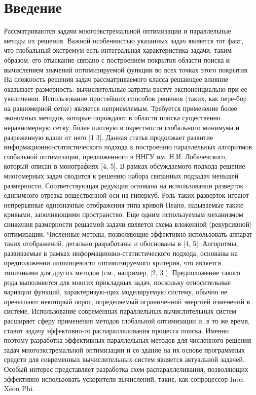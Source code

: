 \section{Введение}
Рассматриваются задачи многоэкстремальной оптимизации и параллельные методы их решения. Важной особенностью указанных задач является тот факт, что глобальный экстремум есть интегральная характеристика задачи, таким образом, его отыскание связано с построением покрытия области поиска и вычислением значений оптимизируемой функции во всех точках этого покрытия. На сложность решения задач рассматриваемого класса решающее влияние оказывает размерность: вычислительные затраты растут экспоненциально при ее увеличении. Использование простейших способов решения (таких, как пере-бор на равномерной сетке) является неприемлемым. Требуется применение более экономных методов, которые порождают в области поиска существенно неравномерную сетку, более плотную в окрестности глобального минимума и разреженную вдали от него [13]. Данная статья продолжает развитие информационно-статистического подхода к построению параллельных алгоритмов глобальной оптимизации, предложенного в ННГУ им. Н.И. Лобачевского, который описан в монографиях [4, 5].
В рамках обсуждаемого подхода решение многомерных задач сводится к решению набора связанных подзадач меньшей размерности. Соответствующая редукция основана на использовании разверток единичного отрезка вещественной оси на гиперкуб. Роль таких разверток играют непрерывные однозначные отображения типа кривой Пеано, называемые также кривыми, заполняющими пространство. Еще одним используемым механизмом снижения размерности решаемой задачи является схема вложенной (рекурсивной) оптимизации. Численные методы, позволяющие эффективно использовать аппарат таких отображений, детально разработаны и обоснованы в [4, 5].
Алгоритмы, развиваемые в рамках информационно-статистического подхода, основаны на предположении липшицевости оптимизируемого критерия, что является типичными для других методов (см., например, [2, 3). Предположение такого рода выполняется для многих прикладных задач, поскольку относительные вариации функций, характеризую-щих моделируемую систему, обычно не превышают некоторый порог, определяемый ограниченной энергией изменений в системе.
Использование современных параллельных вычислительных систем расширяет сферу применения методов глобальной оптимизации и, в то же время, ставит задачу эффективно-го распараллеливания процесса поиска. Именно поэтому разработка эффективных параллельных методов для численного решения задач многоэкстремальной оптимизации и со-здание на их основе программных средств для современных вычислительных систем является актуальной задачей. Особый интерес представляет разработка схем распараллеливания, позволяющих эффективно использовать ускорители вычислений, такие, как сопроцессор Intel Xeon Phi.
